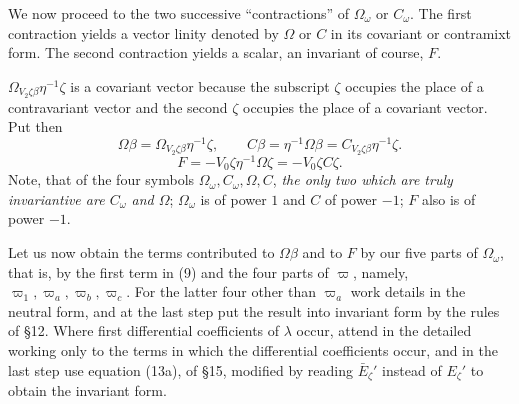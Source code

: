 \documentclass[11pt]{article}
\begin{document}
\indent We now proceed to the two successive ``contractions'' of $\Omega_\omega$ or $C_\omega$. The first contraction yields a vector linity denoted by $\Omega$ or $C$ in its covariant or contramixt form. The second contraction yields a scalar, an invariant of course, $F$.

\indent $\Omega_{V_2\zeta\beta}\eta^{-1}\zeta$ is a covariant vector because the subscript $\zeta$ occupies the place of a contravariant vector and the second $\zeta$ occupies the place of a covariant vector. Put then
\begin{equation}\Omega\beta=\Omega_{V_2\zeta\beta}\eta^{-1}\zeta,\qquad C\beta=\eta^{-1}\Omega\beta=C_{V_2\zeta\beta}\eta^{-1}\zeta.\tag{18}\end{equation}
\begin{equation}F=-V_0\zeta\eta^{-1}\Omega\zeta=-V_0\zeta C\zeta.\tag{19}\end{equation}
\indent Note, that of the four symbols $\Omega_\omega,C_\omega,\Omega,C$, \emph{the only two which are truly invariantive are $C_\omega$ and $\Omega$}; $\Omega_\omega$ is of power $1$ and $C$ of power $-1$; $F$ also is of power $-1$.

\indent Let us now obtain the terms contributed to $\Omega\beta$ and to $F$ by our five parts of $\Omega_\omega$, that is, by the first term in (9) and the four parts of $\varpi$, namely, $\varpi_1,\varpi_a,\varpi_b,\varpi_c$. For the latter four other than $\varpi_a$ work details in the neutral form, and at the last step put the result into invariant form by the rules of \S12. Where first differential coefficients of $\lambda$ occur, attend in the detailed working only to the terms in which the differential coefficients occur, and in
the last step use equation (13a), of \S15, modified by reading $\bar E_\zeta'$ instead of $E_\zeta'$ to obtain the invariant form.
\end{document}
